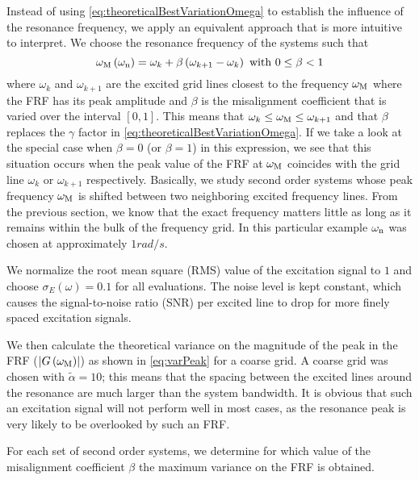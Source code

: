   Instead of using \eqref{eq:theoreticalBestVariationOmega} to establish the influence of the resonance frequency, we apply an equivalent approach that is more intuitive to interpret.
  We choose the resonance frequency of the systems such that
  \begin{equation}
   \omega_{\mathrm{M}}\left( \omega_{\mathrm{n}} \right)  = \omega_k + \beta \left( \omega_{k+1} - \omega_k \right)
   \text{ with } 0 \leq \beta < 1
   \label{eq:chosenVariationOmega}
  \end{equation}
  where $\omega_k$ and $\omega_{k+1}$ are the excited grid lines closest to the frequency $\omega_{\mathrm{M}}$ where the FRF has its peak amplitude and $\beta$ is the misalignment coefficient that is varied over the interval $[0,1]$.
  This means that $\omega_k \leq \omega_{\mathrm{M}} \leq \omega_{k+1}$ and that $\beta$ replaces the $\gamma$ factor in \eqref{eq:theoreticalBestVariationOmega}.
  If we take a look at the special case when $\beta=0$ (or $\beta=1$) in this expression, we see that this situation occurs when the peak value of the FRF at $\omega_{\mathrm{M}}$ coincides with the grid line $\omega_k$ or $\omega_{k+1}$ respectively.
  Basically, we study second order systems whose peak frequency $\omega_{\mathrm{M}}$ is shifted between two neighboring excited frequency lines.
  From the previous section, we know that the exact frequency matters little as long as it remains within the bulk of the frequency grid.
  In this particular example $\omega_{\mathrm{n}}$ was chosen at approximately $1 \unit{rad/s}$.

  We normalize the root mean square (RMS) value of the excitation signal to $1$ and choose $\sigma_E\left( \omega \right) = 0.1$ for all evaluations.
  The noise level is kept constant, which causes the signal-to-noise ratio (SNR) per excited line to drop for more finely spaced excitation signals.
  
  We then calculate the theoretical variance on the magnitude of the peak in the FRF ($\left| G\left( \omega_{\mathrm{M}} \right) \right|$) as shown in \eqref{eq:varPeak} for a coarse grid.
  A coarse grid was chosen with $\tilde{\alpha} = 10$; this means that the spacing between the excited lines around the resonance are much larger than the system bandwidth.
  It is obvious that such an excitation signal will not perform well in most cases, as the resonance peak is very likely to be overlooked by such an FRF.
  
  For each set of second order systems, we determine for which value of the misalignment coefficient $\beta$ the maximum variance on the FRF is obtained.
  
